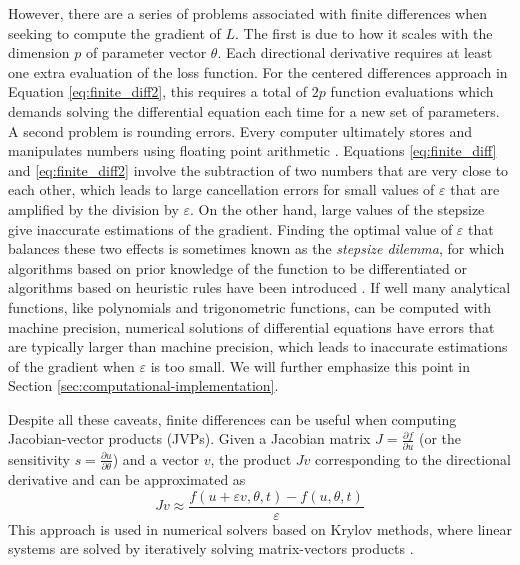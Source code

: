 However, there are a series of problems associated with finite differences when seeking to compute the gradient of $L$.
The first is due to how it scales with the dimension $p$ of parameter vector $\theta$.
Each directional derivative requires at least one extra evaluation of the loss function.
For the centered differences approach in Equation \eqref{eq:finite_diff2}, this requires a total of $2p$ function evaluations which demands solving the differential equation each time for a new set of parameters.
A second problem is rounding errors.
Every computer ultimately stores and manipulates numbers using floating point arithmetic \cite{Goldberg_1991_floatingpoint}. 
Equations \eqref{eq:finite_diff} and \eqref{eq:finite_diff2} involve the subtraction of two numbers that are very close to each other, which leads to large cancellation errors for small values of $\varepsilon$ that are amplified by the division by $\varepsilon$.
On the other hand, large values of the stepsize give inaccurate estimations of the gradient. 
Finding the optimal value of $\varepsilon$ that balances these two effects is sometimes known as the \textit{stepsize dilemma}, for which algorithms based on prior knowledge of the function to be differentiated or algorithms based on heuristic rules have been introduced \cite{mathur2012stepsize-finitediff, BARTON_1992_finite_diff, SUNDIALS-hindmarsh2005sundials}. 
If well many analytical functions, like polynomials and trigonometric functions, can be computed with machine precision, numerical solutions of differential equations have errors that are typically larger than machine precision, which leads to inaccurate estimations of the gradient when $\varepsilon$ is too small. 
We will further emphasize this point in Section \ref{sec:computational-implementation}.

Despite all these caveats, finite differences can be useful when computing Jacobian-vector products (JVPs). 
Given a Jacobian matrix $J = \frac{\partial f}{\partial u}$ (or the sensitivity $s = \frac{\partial u}{\partial \theta}$) and a vector $v$, the product $Jv$ corresponding to the directional derivative and can be approximated as 
\begin{equation}
    Jv \approx \frac{f(u + \varepsilon v, \theta, t) - f(u, \theta, t)}{\varepsilon}
\end{equation}
This approach is used in numerical solvers based on Krylov methods, where linear systems are solved by iteratively solving matrix-vectors products \cite{Ipsen_Meyer_1998}.

